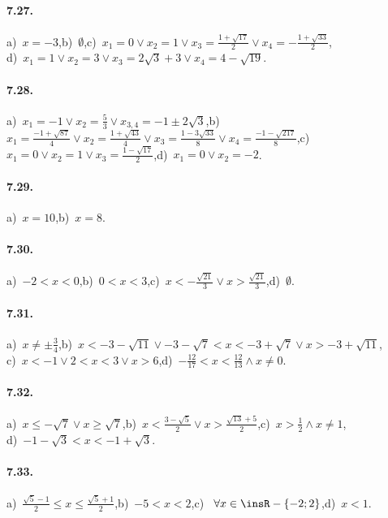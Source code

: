 \paragraph{7.27.} a)~$x=-3$,\quad b)~$\emptyset $,\quad c)~$x_1=0\vee x_2=1\vee x_3=\frac{1+\sqrt{17}} 2\vee x_4=-\frac{1+\sqrt{33}} 2$,\protect\\
\quad d)~$x_1=1\vee x_2=3\vee x_3=2\sqrt 3+3\vee x_4=4-\sqrt{19}$.

\paragraph{7.28.} a)~$x_1=-1\vee x_2=\frac 5 3\vee x_{3,4}=-1\pm 2\sqrt 3$,\quad b)~$x_1=\frac{-1+\sqrt{87}} 4\vee x_2=\frac{1+\sqrt{43}} 4\vee x_3=\frac{1-3\sqrt{33}} 8\vee x_4=\frac{-1-\sqrt{217}} 8$,\quad c)~$x_1=0\vee x_2=1\vee x_3=\frac{1-\sqrt{17}} 2$,\quad d)~$x_1=0\vee x_2=-2$.

\paragraph{7.29.} a)~$x=10$,\quad b)~$x=8$.

\paragraph{7.30.} a)~$ -2<x<0 $,\quad b)~$ 0<x<3 $,\quad c)~$x<-\frac{\sqrt{21}} 3\vee x>\frac{\sqrt{21}} 3$,\quad d)~$\emptyset $.

\paragraph{7.31.} a)~$x\neq \pm \frac 3 4$,\quad b)~$x<-3-\sqrt{11}\vee -3-\sqrt 7<x<-3+\sqrt 7\vee x>-3+\sqrt{11}$,\protect\\
\quad c)~$x<-1\vee 2<x<3\vee x>6$,\quad d)~$-\frac{12}{17}<x<\frac{12}{13}\wedge x\neq 0$.

\paragraph{7.32.} a)~$x\le -\sqrt 7\vee x\ge \sqrt 7$,\quad b)~$x<\frac{3-\sqrt 5} 2\vee x>\frac{\sqrt{13}+5} 2$,\quad c)~$x>\frac 1 2\wedge x\neq 1$,\protect\\
\quad d)~$-1-\sqrt 3<x<-1+\sqrt 3$.

\paragraph{7.33.} a)~$\frac{\sqrt 5-1} 2\le x\le \frac{\sqrt 5+1} 2$,\quad b)~$-5<x<2$,\quad c)~ $ \forall x \in \insR -\{-2;2\} $,\quad d)~$x<1$.

